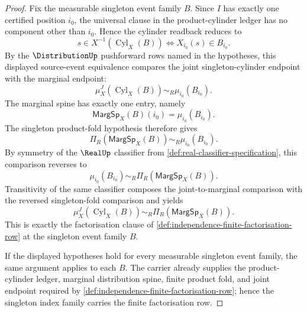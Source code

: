 \begin{proof}
Fix the measurable singleton event family $B$. Since $I$ has exactly one certified position $i_0$, the universal clause in the product-cylinder ledger has no component other than $i_0$. Hence the cylinder readback reduces to
$$
s\in X^{-1}(\operatorname{Cyl}_X(B))
\Longleftrightarrow
X_{i_0}(s)\in B_{i_0}.
$$
By the $\DistributionUp$ pushforward rows named in the hypotheses, this displayed source-event equivalence compares the joint singleton-cylinder endpoint with the marginal endpoint:
$$
\mu_X^J(\operatorname{Cyl}_X(B))\sim_R\mu_{i_0}(B_{i_0}).
$$
The marginal spine has exactly one entry, namely
$$
\mathsf{MargSp}_X(B)(i_0)=\mu_{i_0}(B_{i_0}).
$$
The singleton product-fold hypothesis therefore gives
$$
\Pi_R(\mathsf{MargSp}_X(B))\sim_R\mu_{i_0}(B_{i_0}).
$$
By symmetry of the $\RealUp$ classifier from \autoref{def:real-classifier-specification}, this comparison reverses to
$$
\mu_{i_0}(B_{i_0})\sim_R\Pi_R(\mathsf{MargSp}_X(B)).
$$
Transitivity of the same classifier composes the joint-to-marginal comparison with the reversed singleton-fold comparison and yields
$$
\mu_X^J(\operatorname{Cyl}_X(B))\sim_R\Pi_R(\mathsf{MargSp}_X(B)).
$$
This is exactly the factorisation clause of \autoref{def:independence-finite-factorisation-row} at the singleton event family $B$.

If the displayed hypotheses hold for every measurable singleton event family, the same argument applies to each $B$. The carrier already supplies the product-cylinder ledger, marginal distribution spine, finite product fold, and joint endpoint required by \autoref{def:independence-finite-factorisation-row}; hence the singleton index family carries the finite factorisation row.
\end{proof}

